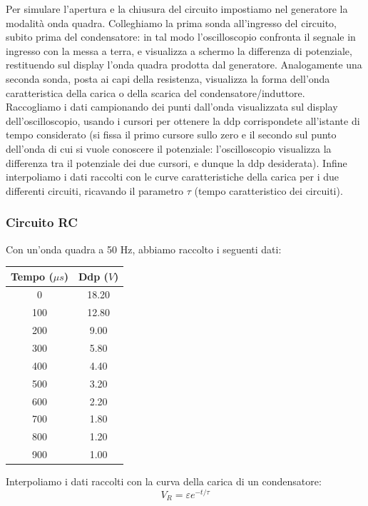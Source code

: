 Per simulare l'apertura e la chiusura del circuito impostiamo nel generatore la modalità onda quadra. Colleghiamo la prima sonda all'ingresso del circuito, subito prima del condensatore: in tal modo l'oscilloscopio confronta il segnale in ingresso con la messa a terra, e visualizza a schermo la differenza di potenziale, restituendo sul display l'onda quadra prodotta dal generatore.  
Analogamente una seconda sonda, posta ai capi della resistenza, visualizza la forma dell'onda caratteristica della carica o della scarica del condensatore/induttore. \\
Raccogliamo i dati campionando dei punti dall'onda visualizzata sul display dell'oscilloscopio, usando i cursori per ottenere la ddp corrispondete all'istante di tempo considerato (si fissa il primo cursore sullo zero e il secondo sul punto dell'onda di cui si vuole conoscere il potenziale: l'oscilloscopio visualizza la differenza tra il potenziale dei due cursori, e dunque la ddp desiderata).
Infine interpoliamo i dati raccolti con le curve caratteristiche della carica per i due differenti circuiti, ricavando il parametro $\tau$ (tempo caratteristico dei circuiti).

\subsubsection{Circuito RC}
Con un'onda quadra a 50 Hz, abbiamo raccolto i seguenti dati:

\begin{center}
\begin{tabular}{*{2}{c}}
Tempo ($\mu s$) & Ddp ($V$) \\
\midrule
0 & 18.20 \\
100 & 12.80 \\
200 & 9.00 \\
300 & 5.80 \\
400 & 4.40 \\
500 & 3.20 \\
600 & 2.20 \\
700 & 1.80 \\
800 & 1.20 \\
900 & 1.00 \\
\end{tabular}
\end{center}

Interpoliamo i dati raccolti con la curva della carica di un condensatore: 
$$V_R = \varepsilon e^{-t/\tau}$$



